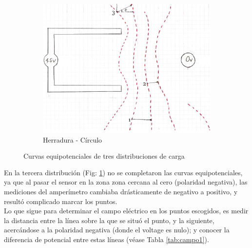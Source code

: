 \documentclass[10pt,twocolumn]{article}
\begin{document}
\begin{figure}
  \vspace{8mm}
  \begin{subfigure}[b]{0.80\linewidth}
    \includegraphics[width=\textwidth]{herradura_es.png}
    \caption{Herradura - Círculo}\label{fig:herradura}
  \end{subfigure}
  \caption{Curvas equipotenciales de tres distribuciones de carga}\label{fig:curvas}
\end{figure}
En la tercera distribución (Fig: \ref{fig:herradura}) no se completaron las curvas equipotenciales, ya que al pasar el sensor en la zona zona cercana al cero (polaridad negativa), las mediciones del amperímetro cambiaba drásticamente de negativo a positivo, y resultó complicado marcar los puntos.\\

  Lo que sigue para determinar el campo eléctrico en los puntos escogidos, es medir la distancia entre la línea sobre la que se situó el punto, y la siguiente, acercándose a la polaridad negativa (donde el voltage es nulo); y conocer la diferencia de potencial entre estas líneas (véase Tabla \ref{tab:campo1}).
\end{document}
